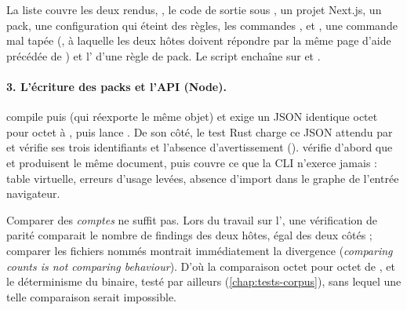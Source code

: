 
La liste couvre les deux rendus, , le code de sortie sous , un projet Next.js, un pack, une configuration qui éteint des règles, les commandes ,  et , une commande mal tapée (, à laquelle les deux hôtes doivent répondre par la même page d'aide précédée de ) et l' d'une règle de pack. Le script enchaîne sur  et .

\paragraph{3. L'écriture des packs et l'API (Node).}  compile  puis  (qui réexporte le même objet) et exige un JSON identique octet pour octet à , puis lance . De son côté, le test Rust  charge ce JSON attendu par  et vérifie ses trois identifiants et l'absence d'avertissement ().  vérifie d'abord que  et  produisent le même document, puis couvre ce que la CLI n'exerce jamais : table virtuelle, erreurs d'usage levées, absence d'import  dans le graphe de l'entrée navigateur.

\begin{piege}
Comparer des \emph{comptes} ne suffit pas. Lors du travail sur l', une vérification de parité comparait le nombre de findings des deux hôtes, égal des deux côtés ; comparer les fichiers nommés montrait immédiatement la divergence (\og \emph{comparing counts is not comparing behaviour}\fg{}). D'où la comparaison octet pour octet de , et le déterminisme du binaire, testé par ailleurs (\cref{chap:tests-corpus}), sans lequel une telle comparaison serait impossible.
\end{piege}

